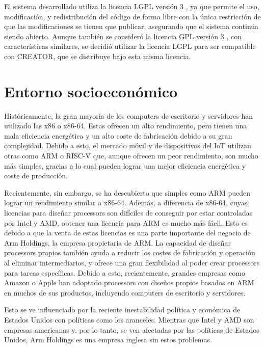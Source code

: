 El sistema desarrollado utiliza la licencia \gls{LGPL} versión 3
\parencite{lgpl}, ya que permite el uso, modificación, y redistribución del
código de forma libre con la única restricción de que las modificaciones se
tienen que publicar, asegurando que el sistema continúa siendo abierto. Aunque
también se consideró la licencia \gls{GPL} versión 3 \parencite{gpl}, con
características similares, se decidió utilizar la licencia LGPL para ser
compatible con CREATOR, que se distribuye bajo esta misma licencia.

\section{Entorno socioeconómico}\label{sec:environment}

Históricamente, la gran mayoría de los \glspl{computer} de escritorio y
servidores han utilizado las  x86 o x86-64. Estas
 ofrecen un alto rendimiento, pero tienen una mala
eficiencia energética y un alto coste de fabricación debido a su gran
complejidad. Debido a esto, el mercado móvil y de dispositivos del \gls{IoT}
utilizan otras  como ARM o RISC-V que, aunque
ofrecen un peor rendimiento, son mucho más simples, gracias a lo cual pueden
lograr una mejor eficiencia energética y coste de producción.

Recientemente, sin embargo, se ha descubierto que 
simples como ARM pueden lograr un rendimiento similar a x86-64. Además, a
diferencia de x86-64, cuyas licencias para diseñar \glspl{processor} son
difíciles de conseguir por estar controladas por Intel y AMD, obtener una
licencia para ARM es mucho más fácil. Esto es debido a que la venta de estas
licencias es una parte importante del negocio de Arm Holdings, la empresa
propietaria de ARM. La capacidad de diseñar \glspl{processor} propios también
ayuda a reducir los costes de fabricación y operación al eliminar
intermediarios, y ofrece una gran flexibilidad al poder crear \glspl{processor}
para tareas específicas. Debido a esto, recientemente, grandes empresas como
Amazon o Apple han adoptado \glspl{processor} con diseños propios basados en ARM
en muchos de sus productos, incluyendo \glspl{computer} de escritorio y
servidores.

Esto se ve influenciado por la reciente inestabilidad política y económica de
Estados Unidos con políticas como los aranceles. Mientras que Intel y AMD son
empresas americanas y, por lo tanto, se ven afectadas por las políticas de
Estados Unidos, Arm Holdings es una empresa inglesa sin estos problemas.

